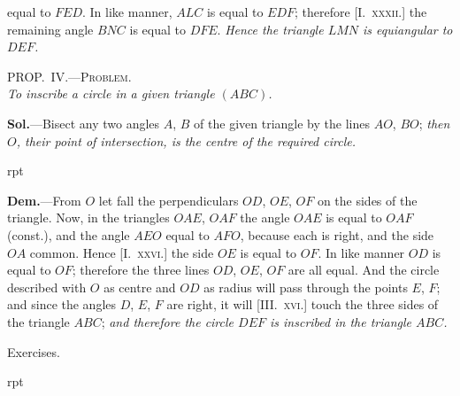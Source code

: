 \documentclass[oneside]{book}
\newcounter{wrapwidth}
\newcommand\myprop[2]{
\bigskip\Needspace*{4\baselineskip}\begin{center}\textsc{#1}\\\medskip\emph{#2}\par\end{center}
}
\newcommand\exheadin[1]{
\par\medskip\Needspace*{4\baselineskip}
\hspace{1.5\parindent}\textsf{#1}\par\medskip
}
\newcommand\imgflow[3]{
\setcounter{wrapwidth}{#1}

\begin{wrapfigure}[#2]{r}{\value{wrapwidth}pt}
\begin{center}
\vspace{-0.3in}

\end{center}
\end{wrapfigure}
}
\begin{document}
equal to $FED$. In like manner, $ALC$ is equal to
$EDF$; therefore [I.~\textsc{xxxii.}] the remaining angle $BNC$
is equal to $DFE$. \textit{Hence the triangle $LMN$ is equiangular
to $DEF$.}

\myprop{PROP\@.~IV\@.---Problem.}{To inscribe a circle in a given triangle $(ABC)$.}

\textbf{Sol.}---Bisect any two angles $A$, $B$ of the given triangle
by the lines $AO$, $BO$; \emph{then $O$, their point of
intersection, is the centre of the required circle.}


\imgflow{120}{11}{f154}

\textbf{Dem.}---From $O$ let fall the perpendiculars $OD$, $OE$,
$OF$ on the sides of the triangle. 
Now, in the triangles $OAE$,
$OAF$ the angle $OAE$ is equal to
$OAF$ (const.), and the angle
$AEO$ equal to $AFO$, because
each is right, and the side $OA$
common. Hence [I.~\textsc{xxvi.}] the
side $OE$ is equal to $OF$. In
like manner $OD$ is equal to $OF$;
therefore the three lines $OD$,
$OE$, $OF$ are all equal. And the
circle described with $O$ as centre and $OD$ as radius will
pass through the points $E$, $F$; and since the angles
$D$, $E$, $F$ are right, it will [III\@.~\textsc{xvi.}] touch the three
sides of the triangle $ABC$; \textit{and therefore the circle $DEF$
is inscribed in the triangle $ABC$.}

\exheadin{Exercises.}


\imgflow{155}{19}{f155}
\end{document}
